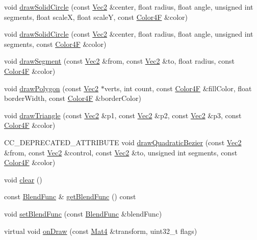 \begin{DoxyCompactItemize}
\item 
void \hyperlink{classDrawNode_ae875c4cb68b20c87ea3d65c88b09e801}{draw\+Solid\+Circle} (const \hyperlink{classVec2}{Vec2} \&center, float radius, float angle, unsigned int segments, float scaleX, float scaleY, const \hyperlink{structColor4F}{Color4F} \&color)
\item 
void \hyperlink{classDrawNode_afd7235844ce36bc75a1dc950f0ab8a4d}{draw\+Solid\+Circle} (const \hyperlink{classVec2}{Vec2} \&center, float radius, float angle, unsigned int segments, const \hyperlink{structColor4F}{Color4F} \&color)
\item 
void \hyperlink{classDrawNode_aa6394fffe90f57a2027289bee80d0ce5}{draw\+Segment} (const \hyperlink{classVec2}{Vec2} \&from, const \hyperlink{classVec2}{Vec2} \&to, float radius, const \hyperlink{structColor4F}{Color4F} \&color)
\item 
void \hyperlink{classDrawNode_a217a186e97728b74c06579375b173992}{draw\+Polygon} (const \hyperlink{classVec2}{Vec2} $\ast$verts, int count, const \hyperlink{structColor4F}{Color4F} \&fill\+Color, float border\+Width, const \hyperlink{structColor4F}{Color4F} \&border\+Color)
\item 
void \hyperlink{classDrawNode_ab8b8098cd512e011428e3732016fa08b}{draw\+Triangle} (const \hyperlink{classVec2}{Vec2} \&p1, const \hyperlink{classVec2}{Vec2} \&p2, const \hyperlink{classVec2}{Vec2} \&p3, const \hyperlink{structColor4F}{Color4F} \&color)
\item 
C\+C\+\_\+\+D\+E\+P\+R\+E\+C\+A\+T\+E\+D\+\_\+\+A\+T\+T\+R\+I\+B\+U\+TE void \hyperlink{classDrawNode_a6e8d1ede793e31611bd10c0f11ede77c}{draw\+Quadratic\+Bezier} (const \hyperlink{classVec2}{Vec2} \&from, const \hyperlink{classVec2}{Vec2} \&control, const \hyperlink{classVec2}{Vec2} \&to, unsigned int segments, const \hyperlink{structColor4F}{Color4F} \&color)
\item 
void \hyperlink{classDrawNode_a9e650c39c26a8ba3c912f21388b2218d}{clear} ()
\item 
const \hyperlink{structBlendFunc}{Blend\+Func} \& \hyperlink{classDrawNode_ae64c516a7111c6102087e7d0ec399759}{get\+Blend\+Func} () const
\item 
void \hyperlink{classDrawNode_aa2fec0829a3f19c5996946fc25eccd66}{set\+Blend\+Func} (const \hyperlink{structBlendFunc}{Blend\+Func} \&blend\+Func)
\item 
virtual void \hyperlink{classDrawNode_ac634e7823879167ff1707108fbabb7df}{on\+Draw} (const \hyperlink{classMat4}{Mat4} \&transform, uint32\+\_\+t flags)
\item 

\end{DoxyCompactItemize}

